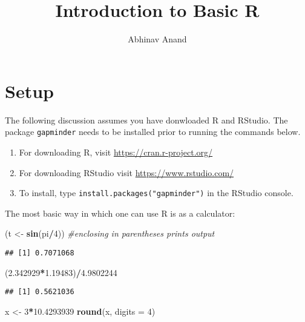 \documentclass[12pt,]{article}
\title{Introduction to Basic R}
\author{Abhinav Anand}
\date{}
\newenvironment{Shaded}{\begin{snugshade}}{\end{snugshade}}
\newcommand{\KeywordTok}[1]{\textcolor[rgb]{0.13,0.29,0.53}{\textbf{#1}}}
\newcommand{\DataTypeTok}[1]{\textcolor[rgb]{0.13,0.29,0.53}{#1}}
\newcommand{\DecValTok}[1]{\textcolor[rgb]{0.00,0.00,0.81}{#1}}
\newcommand{\FloatTok}[1]{\textcolor[rgb]{0.00,0.00,0.81}{#1}}
\newcommand{\StringTok}[1]{\textcolor[rgb]{0.31,0.60,0.02}{#1}}
\newcommand{\CommentTok}[1]{\textcolor[rgb]{0.56,0.35,0.01}{\textit{#1}}}
\newcommand{\OperatorTok}[1]{\textcolor[rgb]{0.81,0.36,0.00}{\textbf{#1}}}
\newcommand{\NormalTok}[1]{#1}
\providecommand{\tightlist}{%
  \setlength{\itemsep}{0pt}\setlength{\parskip}{0pt}}
\begin{document}
\maketitle

\section{Setup}\label{setup}

The following discussion assumes you have donwloaded R and RStudio. The
package \texttt{gapminder} needs to be installed prior to running the
commands below.

\begin{enumerate}
\def\labelenumi{\arabic{enumi}.}
\tightlist
\item
  For downloading R, visit \url{https://cran.r-project.org/}
\item
  For downloading RStudio visit \url{https://www.rstudio.com/}
\item
  To install, type \texttt{install.packages("gapminder")} in the RStudio
  console.
\end{enumerate}

The most basic way in which one can use R is as a calculator:

\begin{Shaded}
\begin{Highlighting}[]
\NormalTok{(t <-}\StringTok{ }\KeywordTok{sin}\NormalTok{(pi}\OperatorTok{/}\DecValTok{4}\NormalTok{)) }\CommentTok{#enclosing in parentheses prints output}
\end{Highlighting}
\end{Shaded}

\begin{verbatim}
## [1] 0.7071068
\end{verbatim}

\begin{Shaded}
\begin{Highlighting}[]
\NormalTok{(}\FloatTok{2.342929}\OperatorTok{*}\FloatTok{1.19483}\NormalTok{)}\OperatorTok{/}\FloatTok{4.9802244}
\end{Highlighting}
\end{Shaded}

\begin{verbatim}
## [1] 0.5621036
\end{verbatim}

\begin{Shaded}
\begin{Highlighting}[]
\NormalTok{x <-}\StringTok{ }\DecValTok{3}\OperatorTok{*}\FloatTok{10.4293939}
\KeywordTok{round}\NormalTok{(x, }\DataTypeTok{digits =} \DecValTok{4}\NormalTok{)}
\end{Highlighting}
\end{Shaded}
\end{document}
